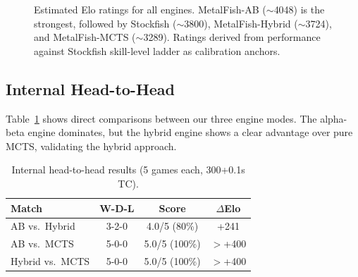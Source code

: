 \documentclass{svproc}
\begin{document}
\begin{figure}[!htbp]
\centering
{}
\caption{Estimated Elo ratings for all engines. MetalFish-AB ($\sim$4048) is the strongest, followed by Stockfish ($\sim$3800), MetalFish-Hybrid ($\sim$3724), and MetalFish-MCTS ($\sim$3289). Ratings derived from performance against Stockfish skill-level ladder as calibration anchors.}
\label{fig:elo}
\end{figure}

\FloatBarrier
\subsection{Internal Head-to-Head}
\label{sec:eval-internal}

Table~\ref{tab:internal} shows direct comparisons between our three engine modes. The alpha-beta engine dominates, but the hybrid engine shows a clear advantage over pure MCTS, validating the hybrid approach.

\begin{table}[!htbp]
\centering
\caption{Internal head-to-head results (5 games each, 300+0.1s TC).}
\label{tab:internal}
\begin{tabular}{lccc}
\toprule
\textbf{Match} & \textbf{W-D-L} & \textbf{Score} & \textbf{$\Delta$Elo} \\
\midrule
AB vs.\ Hybrid  & 3-2-0 & 4.0/5 (80\%) & +241 \\
AB vs.\ MCTS    & 5-0-0 & 5.0/5 (100\%) & $>$+400 \\
Hybrid vs.\ MCTS & 5-0-0 & 5.0/5 (100\%) & $>$+400 \\
\bottomrule
\end{tabular}
\end{table}
\end{document}
